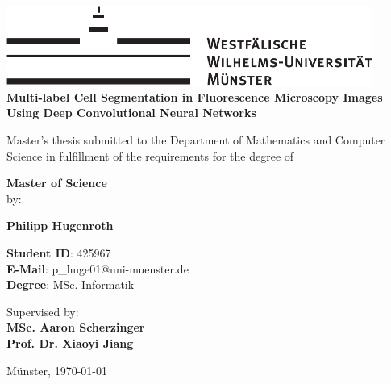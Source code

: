 \begin{centering}
\vspace*{\fill}
\includegraphics[width=12cm]{./img/wwu-logo-neu.pdf}\\[1.5cm]


{\textbf{ \Large
Multi-label Cell Segmentation in Fluorescence Microscopy Images Using Deep Convolutional Neural Networks\\[1.2cm]
}}

{
Master's thesis submitted to the Department of Mathematics and Computer Science in fulfillment of the requirements for the degree of \\[2cm]
}

{\Large \textbf{Master of Science}}\\[2cm]

{
by:
}

{\textbf{ \large
Philipp Hugenroth\\[1cm]
}}

{
\textbf{Student ID}: 425967\\
\textbf{E-Mail}: p\_huge01@uni-muenster.de\\
\textbf{Degree}: MSc. Informatik\\[1cm]
}

    

\hrulefill
                               
{
Supervised by:\\
\textbf{MSc. Aaron Scherzinger}\\
\textbf{Prof. Dr. Xiaoyi Jiang}\\[1cm]
}


{
Münster, \today
}
\vfill
\end{centering}